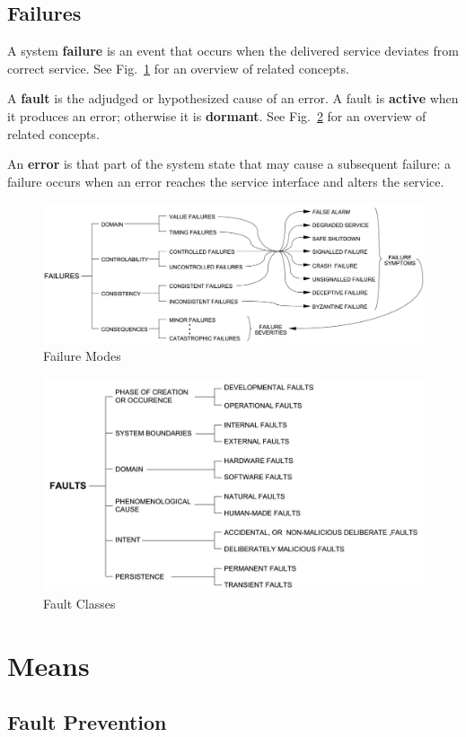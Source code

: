 \subsection{Failures}

A system \textbf{failure} is an event that occurs when the delivered service deviates from correct service.
See Fig.~\ref{fig:concepts_fail} for an overview of related concepts.

A \textbf{fault} is the adjudged or hypothesized cause of an error.
A fault is \textbf{active} when it produces an error; otherwise it is \textbf{dormant}.
See Fig.~\ref{fig:concepts_fault} for an overview of related concepts.

An \textbf{error} is that part of the system state that may cause a subsequent failure: a failure occurs when an error reaches the service interface and alters the service.

\begin{figure}
\centering
\includegraphics[width=0.7\linewidth]{concepts_fail}
\caption{Failure Modes}
\label{fig:concepts_fail}
\end{figure}

\begin{figure}
\centering
\includegraphics[width=0.7\linewidth]{concepts_fault}
\caption{Fault Classes}
\label{fig:concepts_fault}
\end{figure}

\section{Means}

\subsection{Fault Prevention}

